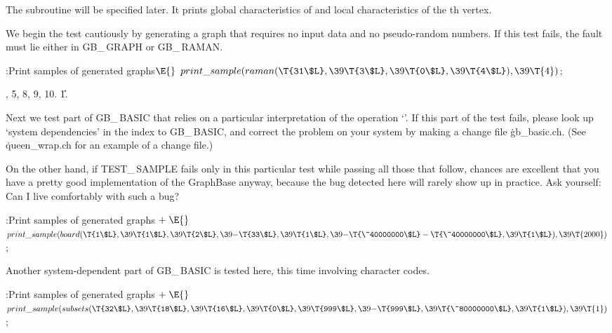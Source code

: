 The subroutine  will be specified later.
It prints global
characteristics of  and local characteristics of the th vertex.

We begin the test cautiously by generating a graph that requires no input data
and no pseudo-random numbers. If this test fails, the fault must lie either in
{\sc GB\_\,GRAPH} or {\sc GB\_\,RAMAN}.

\Y\B\4:Print samples of generated graphs\X${}\E{}$\6
$\\{print\_sample}(\\{raman}(\T{31\$L},\39\T{3\$L},\39\T{0\$L},\39\T{4\$L}),\39%
\T{4}){}$;\par
{}, 5, 8, 9, 10.
\U1.\fi

Next we test part of {\sc GB\_\,BASIC} that relies on a particular
interpretation of the operation `'. If this part
of the test
fails, please look up `system dependencies' in the index to {\sc
GB\_\,BASIC}, and correct the problem on your system by making a change file
\.{gb\_basic.ch}. (See \.{queen\_wrap.ch} for an example of a change file.)

On the other hand, if {\sc TEST\_\,SAMPLE} fails only in this particular test
while passing all those that follow, chances are excellent that
you have a pretty good implementation of the GraphBase anyway,
because the bug detected here will rarely show up in practice. Ask
yourself: Can I live comfortably with such a bug?

\Y\B\4:Print samples of generated graphs\X${}\mathrel+\E{}$\6
$\\{print\_sample}(\\{board}(\T{1\$L},\39\T{1\$L},\39\T{2\$L},\39{-}\T{33\$L},%
\39\T{1\$L},\39{-}\T{\^40000000\$L}-\T{\^40000000\$L},\39\T{1\$L}),\39%
\T{2000}){}$;\par
\fi

Another system-dependent part of {\sc GB\_\,BASIC} is tested here,
this time involving character codes.

\Y\B\4:Print samples of generated graphs\X${}\mathrel+\E{}$\6
$\\{print\_sample}(\\{subsets}(\T{32\$L},\39\T{18\$L},\39\T{16\$L},\39\T{0\$L},%
\39\T{999\$L},\39{-}\T{999\$L},\39\T{\^80000000\$L},\39\T{1\$L}),\39\T{1}){}$;%
\par
\fi

